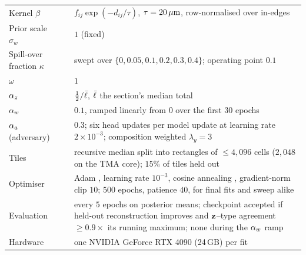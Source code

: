 \begin{table}[!htbp]
\begin{tabular}{@{}p{}p{}p{}@{}}
Kernel $\beta$ & & $f_{ij}\exp(-d_{ij}/\tau)$, $\tau = 20\,\mu\text{m}$, row-normalised over in-edges \\
Prior scale $\sigma_w$ & & $1$ (fixed) \\
\midrule
Spill-over fraction $\kappa$ & & swept over $\{0, 0.05, 0.1, 0.2, 0.3, 0.4\}$; operating point $0.1$ \\
$\omega$ & & $1$ \\
$\alpha_z$ & & $\tfrac12/\bar{\ell}$, $\bar{\ell}$ the section's median total \\
$\alpha_w$ & & $0.1$, ramped linearly from $0$ over the first $30$ epochs \\
$\alpha_a$ (adversary) & & $0.3$; six head updates per model update at learning rate $2 \times 10^{-3}$; composition weighted $\lambda_y = 3$ \\
\midrule
Tiles & & recursive median split into rectangles of $\leq 4{,}096$ cells ($2{,}048$ on the TMA core); $15\%$ of tiles held out \\
Optimiser & & Adam \citep{kingma2015adam}, learning rate $10^{-3}$, cosine annealing \citep{loshchilov2017}, gradient-norm clip $10$; $500$ epochs, patience $40$, for final fits and sweep alike \\
Evaluation & & every $5$ epochs on posterior means; checkpoint accepted if held-out reconstruction improves and $\mathbf{z}$--type agreement $\geq 0.9\times$ its running maximum; none during the $\alpha_w$ ramp \\
Hardware & & one NVIDIA GeForce RTX 4090 (24\,GB) per fit \\
\bottomrule
\end{tabular}
\end{table}

